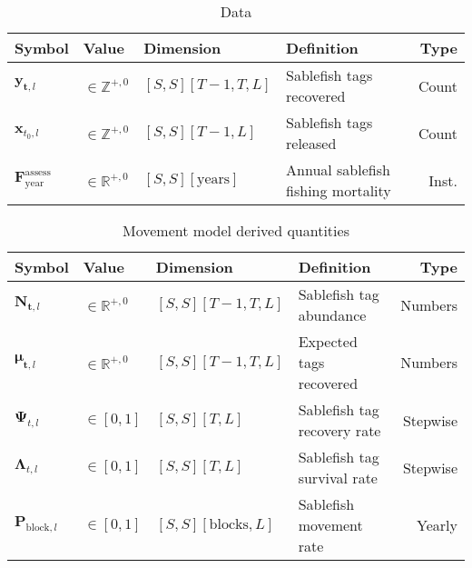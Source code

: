 \documentclass{article}
\begin{document}
\begin{table}[ht]
  \centering
  \caption{Data}
  \renewcommand\arraystretch{1.2}
  \label{tab:data}
  \begin{tabular}{l l l l r}
    \toprule
    \textbf{Symbol} & \textbf{Value} & \textbf{Dimension} & \textbf{Definition} & \textbf{Type} \\
    \toprule
    $\boldsymbol{y}_{\boldsymbol{t},l}$ & $\in \mathbb{Z}^{+,0}$ & $[S,S][T\!-\!1,T,L]$ & Sablefish tags recovered & Count \\
    $\boldsymbol{x}_{t_0,l}$ & $\in \mathbb{Z}^{+,0}$ & $[S,S][T\!-\!1,L]$ & Sablefish tags released & Count \\
    $\boldsymbol{F}^{\mathrm{assess}}_{\mathrm{year}}$ & $\in \mathbb{R}^{+,0}$ & $[S,S][\mathrm{years}]$ & Annual sablefish fishing mortality & Inst. \\    
    \bottomrule
  \end{tabular}
\end{table}

\begin{table}[ht]
  \centering
  \caption{Movement model derived quantities}
  \renewcommand\arraystretch{1.2}
  \label{tab:model-derived}
  \begin{tabular}{l l l l r}
    \toprule
    \textbf{Symbol} & \textbf{Value} & \textbf{Dimension} & \textbf{Definition}  & \textbf{Type} \\
    \toprule
    $\boldsymbol{N}_{\boldsymbol{t},l}$ & $\in \mathbb{R}^{+,0}$ & $[S,S][T\!-\!1,T,L]$ & Sablefish tag abundance & Numbers \\
    $\boldsymbol{\mu}_{\boldsymbol{t},l}$ & $\in \mathbb{R}^{+,0}$ & $[S,S][T\!-\!1,T,L]$ & Expected tags recovered & Numbers \\
    $\boldsymbol{\Psi}_{t,l}$ & $\in \left[0, 1 \right]$ & $[S,S][T,L]$ & Sablefish tag recovery rate & Stepwise \\
    $\boldsymbol{\Lambda}_{t,l}$ & $\in \left[0, 1 \right]$ & $[S,S][T,L]$ & Sablefish tag survival rate & Stepwise \\    
    $\boldsymbol{P}_{\mathrm{block},l}$ & $\in \left[0, 1 \right]$ & $[S,S][\mathrm{blocks},L]$ & Sablefish movement rate & Yearly \\
    \bottomrule
  \end{tabular}
\end{table}
\end{document}
